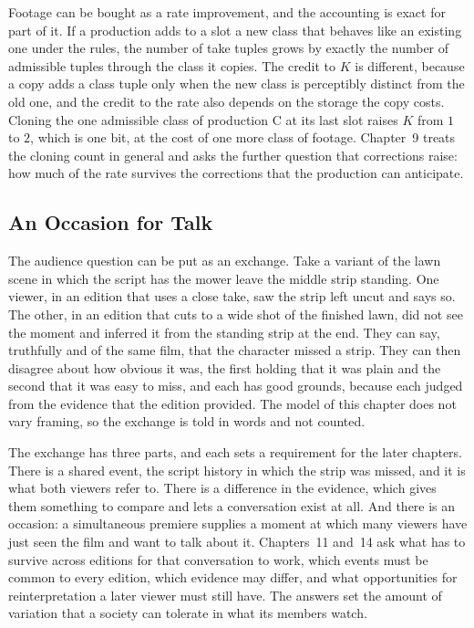 \documentclass[11pt,twoside,openright]{book}
\theoremstyle{plain}
\theoremstyle{definition}
\theoremstyle{remark}
\begin{document}
Footage can be bought as a rate improvement, and the accounting is exact for part of it. If a production adds to a slot a new class that behaves like an existing one under the rules, the number of take tuples grows by exactly the number of admissible tuples through the class it copies. The credit to $K$ is different, because a copy adds a class tuple only when the new class is perceptibly distinct from the old one, and the credit to the rate also depends on the storage the copy costs. Cloning the one admissible class of production C at its last slot raises $K$ from $1$ to $2$, which is one bit, at the cost of one more class of footage. Chapter~9 treats the cloning count in general and asks the further question that corrections raise: how much of the rate survives the corrections that the production can anticipate.

\subsection{An Occasion for Talk}

The audience question can be put as an exchange. Take a variant of the lawn scene in which the script has the mower leave the middle strip standing. One viewer, in an edition that uses a close take, saw the strip left uncut and says so. The other, in an edition that cuts to a wide shot of the finished lawn, did not see the moment and inferred it from the standing strip at the end. They can say, truthfully and of the same film, that the character missed a strip. They can then disagree about how obvious it was, the first holding that it was plain and the second that it was easy to miss, and each has good grounds, because each judged from the evidence that the edition provided. The model of this chapter does not vary framing, so the exchange is told in words and not counted.

The exchange has three parts, and each sets a requirement for the later chapters. There is a shared event, the script history in which the strip was missed, and it is what both viewers refer to. There is a difference in the evidence, which gives them something to compare and lets a conversation exist at all. And there is an occasion: a simultaneous premiere supplies a moment at which many viewers have just seen the film and want to talk about it. Chapters~11 and~14 ask what has to survive across editions for that conversation to work, which events must be common to every edition, which evidence may differ, and what opportunities for reinterpretation a later viewer must still have. The answers set the amount of variation that a society can tolerate in what its members watch.
\end{document}
